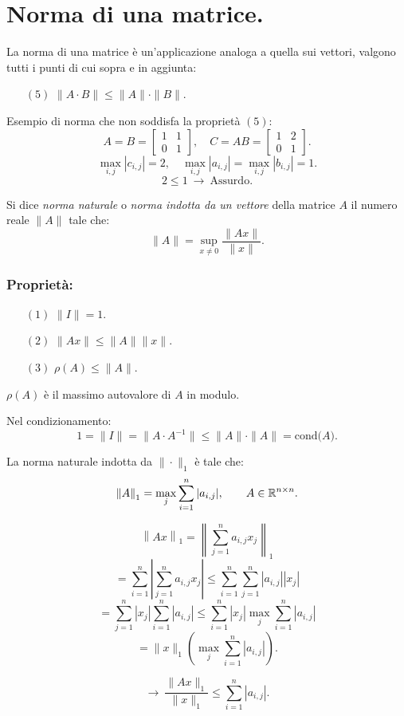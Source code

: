 \section{Norma di una matrice.}
La norma di una matrice è un'applicazione analoga a quella sui vettori, 
valgono tutti i punti di cui sopra e in aggiunta:
\begin{itemize}
\item[$(5)$] $\|A\cdot B\| \leq \|A\|\cdot\|B\|$.
\end{itemize}

\begin{exe}Esempio di norma che non soddisfa la proprietà $(5)$:
\[
A = B = \left[\begin{array}{cc}1 & 1 \\ 0 & 1\end{array}\right], \quad
C = AB = \left[\begin{array}{cc}1 & 2 \\ 0 & 1\end{array}\right].
\]
\[
\max_{i,j}|c_{i,j}| = 2, \quad \max_{i,j}|a_{i,j}| = \max_{i,j}|b_{i,j}| = 1.
\]
\[2 \leq 1 \ \longrightarrow\ \textrm{Assurdo.} \]
\end{exe}

\begin{defi}
Si dice \emph{norma naturale} o \emph{norma indotta da un vettore} della
matrice $A$ il numero reale $\|A\|$ tale che:
\[
\|A\|= \sup_{x \neq 0}\frac{\|Ax\|}{\|x\|}.
\]
\end{defi}
\subsubsection{Proprietà:}
\begin{itemize}
\item[$(1)$]$\|I\| =1$.
\item[$(2)$]$\|Ax\| \leq \|A\|\|x\|$.
\item[$(3)$]$\rho(A)\leq \|A\|$.
\end{itemize}

$\rho(A)$ è il massimo autovalore di $A$ in modulo.

\begin{flushleft}
Nel condizionamento:
\[
1 = \|I\| = \|A\cdot A^{-1}\| \leq \|A\|\cdot\|A\| = 
\textrm{cond(}A\textrm{)}.
\]
\end{flushleft}

\begin{prop}
La norma naturale indotta da $\|\cdot\|_1$ è tale che:
\[
\left\|A\right\|_1 = \max_j \sum_{i = 1}^n|a_{i,j}|, \qquad A \in \mathbb{R}^{n\times n}.
\]
\end{prop}
\begin{dimo}
\[ \left\|Ax\right\|_1  =  \left\| \sum_{j=1}^n a_{i,j}x_j\right\|_1 \]
\[ =  \sum_{i=1}^n\left|\sum_{j=1}^n a_{i,j}x_j\right| \leq  
\sum_{i=1}^n\sum_{j=1}^n |a_{i,j}||x_j| \]
\[ =  \sum_{j=1}^n|x_j|\sum_{i=1}^n |a_{i,j}|
\leq  \sum_{i=1}^n|x_j| \max_j\sum_{i=1}^n |a_{i,j}| \]
\[ =  \|x\|_1 (\max_j\sum_{i=1}^n |a_{i,j}|). \]

\[
\longrightarrow \ \frac{\|Ax\|_1}{\|x\|_1} \leq \sum_{i=1}^n |a_{i,j}|.
\]
\end{dimo}


